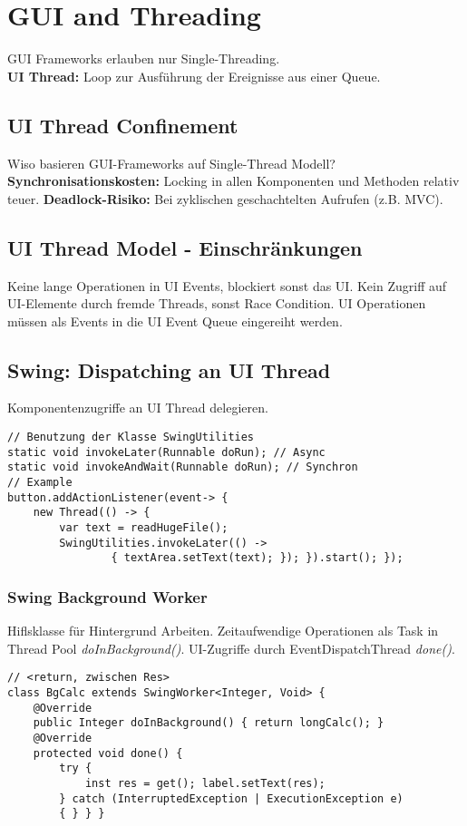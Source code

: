 \section{GUI and Threading}
GUI Frameworks erlauben nur Single-Threading. \\ 
\textbf{UI Thread:} Loop zur Ausführung der Ereignisse aus einer Queue.
\subsection{UI Thread Confinement}
Wiso basieren GUI-Frameworks auf Single-Thread Modell?\\
\textbf{Synchronisationskosten:} Locking in allen Komponenten und Methoden relativ teuer.
\textbf{Deadlock-Risiko:} Bei zyklischen geschachtelten Aufrufen (z.B. MVC).

\subsection{UI Thread Model - Einschränkungen}
Keine lange Operationen in UI Events, blockiert sonst das UI.
Kein Zugriff auf UI-Elemente durch fremde Threads, sonst Race Condition. 
UI Operationen müssen als Events in die UI Event Queue eingereiht werden.

\subsection{Swing: Dispatching an UI Thread}
Komponentenzugriffe an UI Thread delegieren.
\begin{lstlisting}
// Benutzung der Klasse SwingUtilities
static void invokeLater(Runnable doRun); // Async
static void invokeAndWait(Runnable doRun); // Synchron 
// Example
button.addActionListener(event-> {
    new Thread(() -> {
        var text = readHugeFile();
        SwingUtilities.invokeLater(() -> 
                { textArea.setText(text); }); }).start(); });
\end{lstlisting}

\subsubsection{Swing Background Worker}
Hiflsklasse für Hintergrund Arbeiten.
Zeitaufwendige Operationen als Task in Thread Pool \textit{doInBackground()}.
UI-Zugriffe durch EventDispatchThread \textit{done()}.
\begin{lstlisting}
// <return, zwischen Res>
class BgCalc extends SwingWorker<Integer, Void> {
    @Override
    public Integer doInBackground() { return longCalc(); }
    @Override
    protected void done() {
        try {
            inst res = get(); label.setText(res);
        } catch (InterruptedException | ExecutionException e) 
        { } } }
\end{lstlisting}


